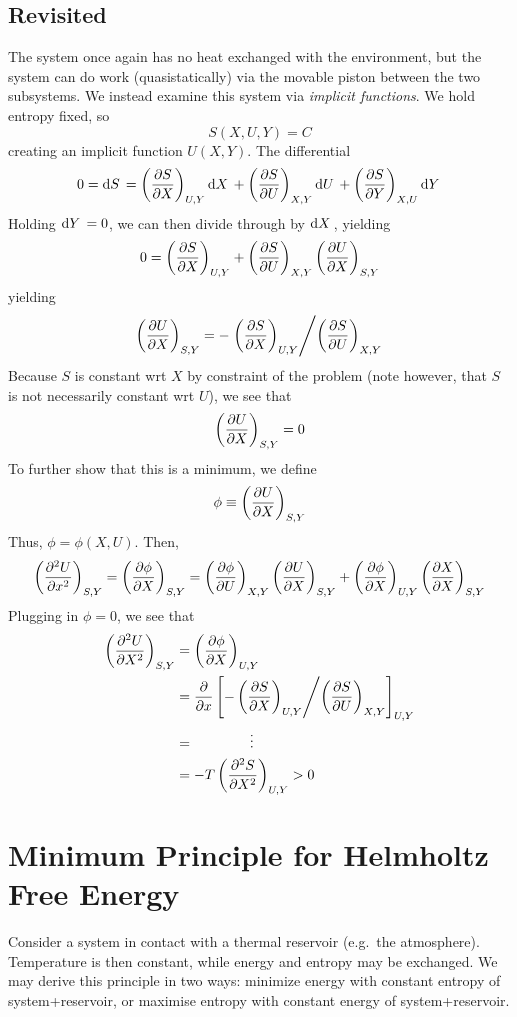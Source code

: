 \subsection{Revisited}
The system once again has no heat exchanged with the environment, but the system can do work (quasistatically) via the movable piston between the two subsystems. We instead examine this system via \emph{implicit functions}. We hold entropy fixed, so 
\[S(X,U,Y)=C\]
creating an implicit function \(U(X,Y)\). The differential
\[0=\d{S}=\left(\pder{S}{X}\right)_{U,Y}\d{X}+\left(\pder{S}{U}\right)_{X,Y}\d{U}+\left(\pder{S}{Y}\right)_{X,U}\d{Y}\]
Holding \(\d{Y}=0\), we can then divide through by \(\d{X}\), yielding
\[0 = \left(\frac{\partial S}{\partial X}\right)_{U,Y}+\left(\frac{\partial S}{\partial U}\right)_{X,Y}\left(\frac{\partial U}{\partial X}\right)_{S,Y}\]
yielding
\begin{equation}
	\left(\frac{\partial U}{\partial X}\right)_{S,Y} = -\left.\left(\frac{\partial S}{\partial X}\right)_{U,Y}\middle/\left(\frac{\partial S}{\partial U}\right)_{X,Y}\right.
\end{equation}
Because \(S\) is constant wrt \(X\) by constraint of the problem (note however, that \(S\) is not necessarily constant wrt \(U\)), we see that
\begin{equation}
	\left(\frac{\partial U}{\partial X}\right)_{S,Y}=0
\end{equation}
To further show that this is a minimum, we define
\[\phi\equiv\left(\frac{\partial U}{\partial X}\right)_{S,Y}\]
Thus, \(\phi = \phi(X,U)\). Then,
\[\left(\frac{\partial ^2U}{\partial x^2}\right)_{S,Y}=\left(\frac{\partial \phi}{\partial X}\right)_{S,Y} = \left(\frac{\partial \phi}{\partial U}\right)_{X,Y}\left(\frac{\partial U}{\partial X}\right)_{S,Y}+\left(\frac{\partial \phi}{\partial X}\right)_{U,Y}\left(\frac{\partial X}{\partial X}\right)_{S,Y}\]
Plugging in \(\phi=0\), we see that
\begin{align*}
	\left(\frac{\partial ^2U}{\partial X^2}\right)_{S,Y} &=\left(\frac{\partial \phi}{\partial X}\right)_{U,Y}\\
					   &=\frac{\partial }{\partial x}\left[-\left(\frac{\partial S}{\partial X}\right)_{U,Y}\middle/\left(\frac{\partial S}{\partial U}\right)_{X,Y}\right]_{U,Y}\\
					   &=\hspace{4em}\vdots\\
					   &=-T\left(\frac{\partial ^2S}{\partial X^2}\right)_{U,Y}>0
\end{align*}

\section{Minimum Principle for Helmholtz Free Energy}
Consider a system in contact with a thermal reservoir (e.g.\ the atmosphere). Temperature is then constant, while energy and entropy may be exchanged. We may derive this principle in two ways: minimize energy with constant entropy of system+reservoir, or maximise entropy with constant energy of system+reservoir.

